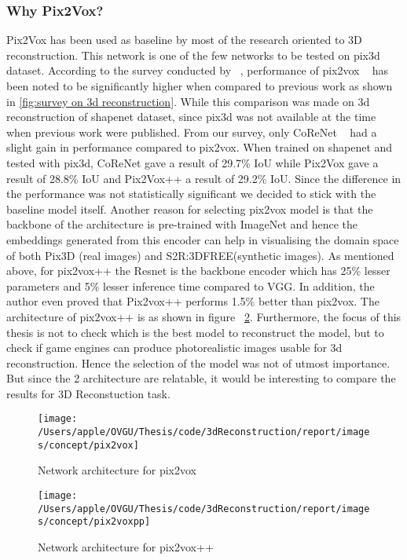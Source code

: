 \subsubsection{Why Pix2Vox?}
Pix2Vox has been used as baseline by most of the research oriented to 3D reconstruction.
This network is one of the few networks to be tested on pix3d dataset.
According to the survey conducted by ~\cite{Han2021ImageBased3O}, performance of pix2vox ~\cite{Xie_2019}
has been noted to be significantly higher when compared to previous work  as shown in \ref{fig:survey on 3d reconstruction}.
While this comparison was made on 3d reconstruction of shapenet dataset, since pix3d was not available at the time when previous work were published.
From our survey, only CoReNet ~\cite{popov2020corenet} had a slight gain in performance compared to pix2vox.
When trained on shapenet and tested with pix3d, CoReNet gave a result of 29.7\% IoU while Pix2Vox gave a result of 28.8\% IoU and Pix2Vox++ a result of 29.2\% IoU.
Since the difference in the performance was not statistically significant we decided to stick with the baseline model itself.
Another reason for selecting pix2vox model is that the backbone of the architecture is pre-trained with ImageNet and
hence the embeddings generated from this encoder can help in visualising the domain space of both Pix3D (real images) and S2R:3DFREE(synthetic images).
As mentioned above, for pix2vox++ the Resnet is the backbone encoder which has 25\% lesser parameters and 5\% lesser inference time compared to VGG.
In addition, the author even proved that Pix2vox++ performs 1.5\% better than pix2vox.
The architecture of pix2vox++ is as shown in figure ~\ref{fig:pix2voxpp architecture}.
Furthermore, the focus of this thesis is not to check which is the best model to reconstruct the model, but to check if game engines can produce photorealistic images usable for 3d reconstruction.
Hence the selection of the model was not of utmost importance.
But since the 2 architecture are relatable, it would be interesting to compare the results for 3D Reconstuction task.
\begin{figure}
    \centering
    \texttt{[image: /Users/apple/OVGU/Thesis/code/3dReconstruction/report/images/concept/pix2vox]}
    \caption{Network architecture for pix2vox~\cite{Xie_2019}}
    \label{fig:pix2vox architecture}
\end{figure}

\begin{figure}
    \centering
    \texttt{[image: /Users/apple/OVGU/Thesis/code/3dReconstruction/report/images/concept/pix2voxpp]}
    \caption{Network architecture for pix2vox++~\cite{Xie_2020}}
    \label{fig:pix2voxpp architecture}
\end{figure}

